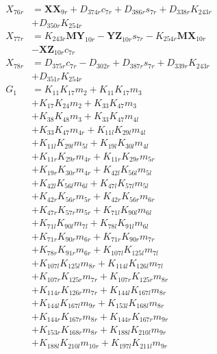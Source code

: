 \begin{multicols}{2}
\begin{align}
X_{76r} &= \mathbf{XX}_{9r} + D_{374r}c_{7r} + D_{386r}s_{7r} + D_{338r}K_{243r}  \nonumber \\
&+ D_{350r}K_{254r} \nonumber \\
X_{77r} &= K_{243r}\mathbf{MY}_{10r} - \mathbf{YZ}_{10r}s_{7r} - K_{254r}\mathbf{MX}_{10r}  \nonumber \\
&- \mathbf{XZ}_{10r}c_{7r} \nonumber \\
X_{78r} &= D_{375r}c_{7r} - D_{302r} + D_{387r}s_{7r} + D_{339r}K_{243r}  \nonumber \\
&+ D_{351r}K_{254r} \nonumber \\
G_{1} &= K_{11}K_{17}m_2 + K_{11}K_{17}m_3  \nonumber \\
&+ K_{17}K_{24}m_2 + K_{33}K_{47}m_3  \nonumber \\
&+ K_{38}K_{48}m_3 + K_{33}K_{47}m_{4l}  \nonumber \\
&+ K_{33}K_{47}m_{4r} + K_{11l}K_{29l}m_{4l}  \nonumber \\
&+ K_{11l}K_{29l}m_{5l} + K_{19l}K_{30l}m_{4l}  \nonumber \\
&+ K_{11r}K_{29r}m_{4r} + K_{11r}K_{29r}m_{5r}  \nonumber \\
&+ K_{19r}K_{30r}m_{4r} + K_{42l}K_{56l}m_{5l}  \nonumber \\
&+ K_{42l}K_{56l}m_{6l} + K_{47l}K_{57l}m_{5l}  \nonumber \\
&+ K_{42r}K_{56r}m_{5r} + K_{42r}K_{56r}m_{6r}  \nonumber \\
&+ K_{47r}K_{57r}m_{5r} + K_{71l}K_{90l}m_{6l}  \nonumber \\
&+ K_{71l}K_{90l}m_{7l} + K_{78l}K_{91l}m_{6l}  \nonumber \\
&+ K_{71r}K_{90r}m_{6r} + K_{71r}K_{90r}m_{7r}  \nonumber \\
&+ K_{78r}K_{91r}m_{6r} + K_{107l}K_{125l}m_{7l}  \nonumber \\
&+ K_{107l}K_{125l}m_{8r} + K_{114l}K_{126l}m_{7l}  \nonumber \\
&+ K_{107r}K_{125r}m_{7r} + K_{107r}K_{125r}m_{8r}  \nonumber \\
&+ K_{114r}K_{126r}m_{7r} + K_{144l}K_{167l}m_{8r}  \nonumber \\
&+ K_{144l}K_{167l}m_{9r} + K_{153l}K_{168l}m_{8r}  \nonumber \\
&+ K_{144r}K_{167r}m_{8r} + K_{144r}K_{167r}m_{9r}  \nonumber \\
&+ K_{153r}K_{168r}m_{8r} + K_{188l}K_{210l}m_{9r}  \nonumber \\
&+ K_{188l}K_{210l}m_{10r} + K_{197l}K_{211l}m_{9r}  \nonumber \\

\end{align}
\end{multicols}
